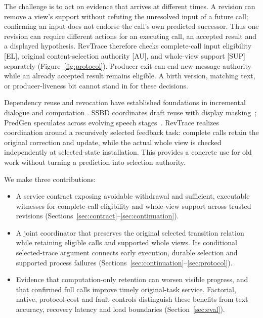 The challenge is to act on evidence that arrives at different times.
A revision can remove a view's support without refuting the unresolved
input of a future call; confirming an input does not endorse the call's
own predicted successor. Thus one revision can require different actions
for an executing call, an accepted result and a displayed hypothesis.
RevTrace therefore checks complete-call input eligibility [EL], original
content-selection authority [AU], and whole-view support [SUP] separately
(Figure~\ref{fig:protocol}). Producer exit can end new-message authority
while an already accepted result remains eligible. A birth version,
matching text, or producer-liveness bit cannot stand in for these decisions.

Dependency reuse and revocation have established foundations in
incremental dialogue and computation
\cite{schlangen2011incremental,hammer2014adapton,hammer2015names}.
SSBD coordinates draft reuse with display masking~\cite{zeng2026ssbd};
PredGen speculates across evolving speech stages~\cite{li2025predgen}.
RevTrace realizes coordination around a recursively selected feedback
task: complete calls retain the original correction and update, while
the actual whole view is checked independently at selected-state
installation. This provides a concrete use for old work without turning
a prediction into selection authority.

We make three contributions:
\begin{itemize}
\item A service contract exposing avoidable withdrawal and sufficient,
  executable witnesses for complete-call eligibility and whole-view
  support across trusted revisions
  (Sections~\ref{sec:contract}--\ref{sec:continuation}).
\item A joint coordinator that preserves the original selected transition
  relation while retaining eligible calls and supported whole views.
  Its conditional selected-trace argument connects early execution,
  durable selection and supported process failures
  (Sections~\ref{sec:continuation}--\ref{sec:protocol}).
\item Evidence that computation-only retention can worsen visible
  progress, and that confirmed full calls improve timely original-task
  service. Factorial, native, protocol-cost and fault controls distinguish these benefits
  from text accuracy, recovery latency and load boundaries
  (Section~\ref{sec:eval}).
\end{itemize}

